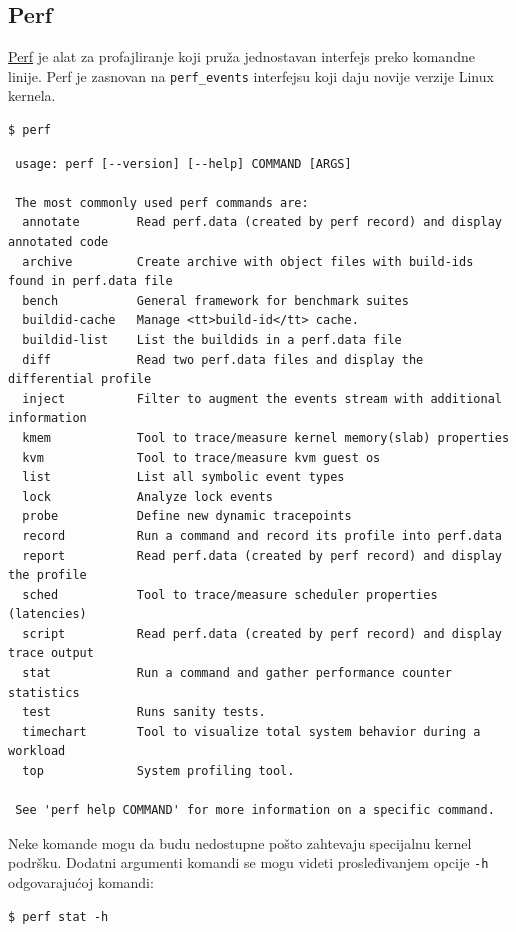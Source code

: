 \subsection{Perf}\label{perf}

\href{https://perf.wiki.kernel.org}{Perf} je alat za profajliranje koji pruža jednostavan interfejs preko komandne linije. Perf je zasnovan na \texttt{perf\_events} interfejsu koji daju novije verzije Linux kernela.

\begin{verbatim}
$ perf
\end{verbatim}

\begin{verbatim}
 usage: perf [--version] [--help] COMMAND [ARGS]

 The most commonly used perf commands are:
  annotate        Read perf.data (created by perf record) and display annotated code
  archive         Create archive with object files with build-ids found in perf.data file
  bench           General framework for benchmark suites
  buildid-cache   Manage <tt>build-id</tt> cache.
  buildid-list    List the buildids in a perf.data file
  diff            Read two perf.data files and display the differential profile
  inject          Filter to augment the events stream with additional information
  kmem            Tool to trace/measure kernel memory(slab) properties
  kvm             Tool to trace/measure kvm guest os
  list            List all symbolic event types
  lock            Analyze lock events
  probe           Define new dynamic tracepoints
  record          Run a command and record its profile into perf.data
  report          Read perf.data (created by perf record) and display the profile
  sched           Tool to trace/measure scheduler properties (latencies)
  script          Read perf.data (created by perf record) and display trace output
  stat            Run a command and gather performance counter statistics
  test            Runs sanity tests.
  timechart       Tool to visualize total system behavior during a workload
  top             System profiling tool.

 See 'perf help COMMAND' for more information on a specific command.
\end{verbatim}

Neke komande mogu da budu nedostupne pošto zahtevaju specijalnu kernel podršku. Dodatni argumenti komandi se mogu videti prosleđivanjem opcije \texttt{-h} odgovarajućoj komandi:

\begin{verbatim}
$ perf stat -h
\end{verbatim}


